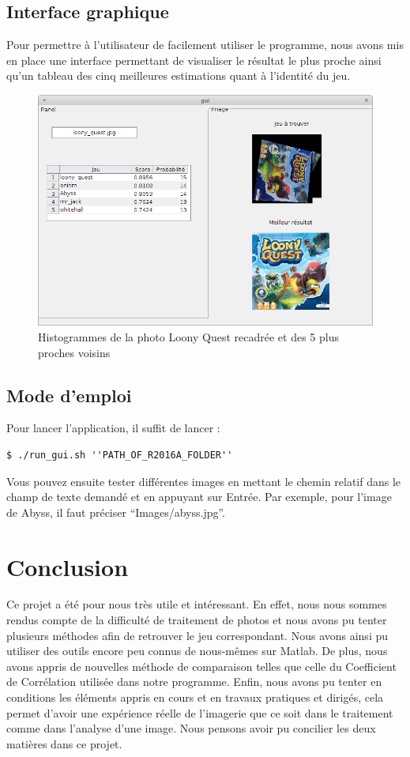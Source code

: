 \documentclass{st50_template}
\begin{document}
\subsection{Interface graphique}
Pour permettre à l'utilisateur de facilement utiliser le programme, nous avons mis en place une interface permettant de visualiser le résultat le plus proche ainsi qu'un tableau des cinq meilleures estimations quant à l'identité du jeu.

\begin{figure}[ht]
    \centering
    \includegraphics[width=\textwidth]{images/interface.png}
    \caption{Histogrammes de la photo Loony Quest recadrée et des 5 plus proches voisins}
    \label{interface}
\end{figure}

\subsection{Mode d'emploi}
Pour lancer l'application, il suffit de lancer :
\begin{lstlisting}[frame=single]
 $ ./run_gui.sh ''PATH_OF_R2016A_FOLDER''
\end{lstlisting}

Vous pouvez ensuite tester différentes images en mettant le chemin relatif dans le champ de texte demandé et en appuyant sur Entrée. Par exemple, pour l'image de Abyss, il faut préciser ``Images/abyss.jpg''.


\section{Conclusion}

Ce projet a été pour nous très utile et intéressant. En effet, nous nous sommes rendus compte de la difficulté de traitement de photos et nous avons pu tenter plusieurs méthodes afin de retrouver le jeu correspondant. Nous avons ainsi pu utiliser des outils encore peu connus de nous-mêmes sur Matlab. De plus, nous avons appris de nouvelles méthode de comparaison telles que celle du Coefficient de Corrélation utilisée dans notre programme. Enfin, nous avons pu tenter en conditions les éléments appris en cours et en travaux pratiques et dirigés, cela permet d'avoir une expérience réelle de l'imagerie que ce soit dans le traitement comme dans l'analyse d'une image. Nous pensons avoir pu concilier les deux matières dans ce projet.
\end{document}
